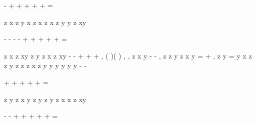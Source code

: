 \partial 
\partial 
\partial 
\partial 
\partial 
\partial 
\partial 
\partial 
\partial 
-
\partial 
\partial 
\partial 
+
\cdots 
+
\cdots 
+
+
\cdots 
+
\cdots 
=




\partial 
\partial 
\partial \partial 
\partial 
\partial 
\partial \partial 
\partial 
\partial 
\partial 
\partial 




z x
z
y
x
z
x
z
x
z
y
y
z
xy
\rho 
\rho 
\rho 
\rho \theta \rho 
\rho 
\rho 
\rho 
\theta \rho \rho 
\theta 
\rho 
\rho 
\theta 
\rho 




\partial 
\partial 
-
\partial 
-
\partial 
\partial 
-
-
\partial 
+
\cdots 
+
\cdots 
+
+
\cdots 
+
\cdots 
=




\partial 
\partial \partial 
\partial 
\partial \partial 
\partial 
\partial 




z x
z
xy
z y
z
x
z
xy
\rho 
\rho 
\rho 
\rho \theta \rho 
\theta 
\rho 
\rho 
\rho 
\theta 
\rho 
\partial 
\partial 
\partial 
\partial 
-
\partial 
-
+
+
\cdots 
+
\cdots 
\partial 
\partial \partial 
\partial 
\partial 
\partial 
, 
(
)(
)
,
,
z
x y
\rho \theta 
-
-
,
z
z
y
z
x
y
\rho \rho 
\theta 
\rho 
\partial 
\partial 
\partial 
=
\cdots 
+
\cdots 
\partial 
\partial 
\partial 
,
z
y
\partial 
=
\partial 
y
x
z
z
y
z
z
z
x
z
y
y
y
y
y
y
\rho 
\rho 
\rho 
\rho 
\rho 
\theta 
\rho 
\theta 
\rho 
\rho \theta 
\rho 
\rho 
\rho 
\theta \rho 
\theta 
\rho 
\theta 
\rho 
\partial 
\partial 
\cdots 
-\cdots 
-\cdots 
\cdots 




\partial 
\partial 
\partial 
\partial 
\partial 
\partial 
\partial 
\partial 
\partial 
\partial 
\partial 
\partial 
+
\cdots 
+
\cdots 
+
+
\cdots 
+
\cdots 
=




\partial 
\partial 
\partial \partial 
\partial 
\partial 
\partial \partial 
\partial 
\partial 
\partial 
\partial 




z y
z
x
y
z
y
z
y
z x
x
z
xy
\rho 
\rho 
\rho 
\rho \theta \rho 
\rho 
\rho 
\rho 
\theta \rho \rho 
\theta 
\rho 
\rho 
\theta 
\rho 




\partial 
\partial 
\partial 
-
\partial 
\partial 
\partial 
-
+
\cdots 
+
\cdots 
+
+
\cdots 
+
\cdots 
=




